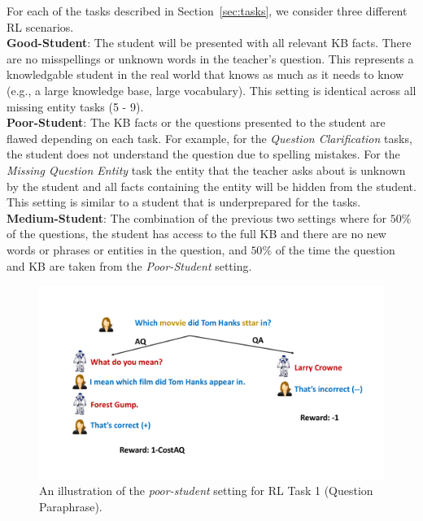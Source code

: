 \noindent For each of the tasks described in Section~\ref{sec:tasks}, we consider
three different RL scenarios.\\
{\bf  Good-Student}: The student will be presented with
all relevant KB facts. There are no misspellings or unknown words in
the teacher's question. This represents a knowledgable student in the real
world that knows as much as it needs to know (e.g., a large knowledge
base, large vocabulary). This setting is identical across all missing entity
tasks (5 - 9). \\
{\bf  Poor-Student}: The KB facts or the questions presented to the
student are flawed depending on each task. For example,
for the {\it Question Clarification} tasks, the student does not understand the
question due to spelling mistakes. For the  {\it Missing Question Entity}
task the entity that the teacher asks about is unknown by the student and
all facts containing the entity will be hidden from the student.  This setting is
similar to a student that is underprepared for the tasks. \\
{\bf Medium-Student}: The combination of the previous two settings where
for $50\%$ of the questions, the student has access to the full KB and there
are no new words or phrases or entities in the question,
and $50\%$ of the time the question and KB are taken from the
{\it Poor-Student} setting.




\vspace{-3mm}
\begin{figure}[!ht]
    \centering
    \includegraphics[width=4.5in]{img/RL.pdf}
    \vspace{-8mm}
\caption{An illustration of the {\it poor-student } setting for RL Task 1 (Question Paraphrase). }
\label{RL_illustration}
\end{figure}



